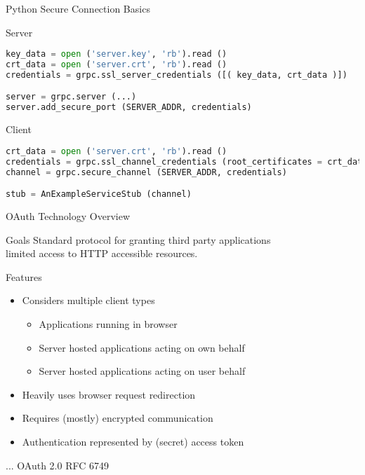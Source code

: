 \begin{frame}[fragile]{Python Secure Connection Basics}
    \begin{block}{Server}
\begin{lstlisting}[language=python,style=mini]
key_data = open ('server.key', 'rb').read ()
crt_data = open ('server.crt', 'rb').read ()
credentials = grpc.ssl_server_credentials ([( key_data, crt_data )])

server = grpc.server (...)
server.add_secure_port (SERVER_ADDR, credentials)
\end{lstlisting}
    \end{block}

    \bigskip

    \begin{block}{Client}
\begin{lstlisting}[language=python,style=mini]
crt_data = open ('server.crt', 'rb').read ()
credentials = grpc.ssl_channel_credentials (root_certificates = crt_data)
channel = grpc.secure_channel (SERVER_ADDR, credentials)

stub = AnExampleServiceStub (channel)
\end{lstlisting}
    \end{block}
\end{frame}


\begin{frame}{OAuth Technology Overview}
    \begin{block}{Goals}
        Standard protocol for granting third party applications \\ limited access to HTTP accessible resources.
    \end{block}

    \bigskip

    \begin{block}{Features}
        \begin{itemize}
            \item Considers multiple client types
            \begin{itemize}
                \item Applications running in browser
                \item Server hosted applications acting on own behalf
                \item Server hosted applications acting on user behalf
            \end{itemize}
            \item Heavily uses browser request redirection
            \item Requires (mostly) encrypted communication
            \item Authentication represented by (secret) access token
        \end{itemize}
    \end{block}

    \bigskip

    \hfill ... OAuth 2.0 RFC 6749
\end{frame}


